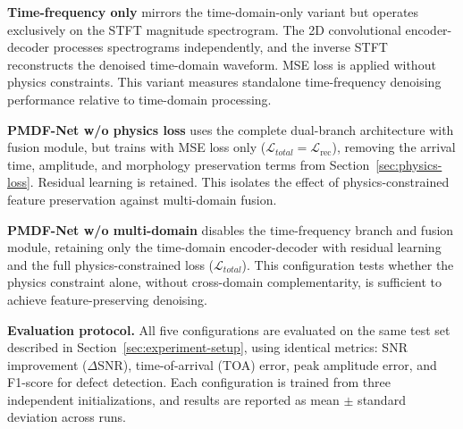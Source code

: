 \textbf{Time-frequency only} mirrors the time-domain-only variant but operates exclusively on the STFT magnitude spectrogram. The 2D convolutional encoder-decoder processes spectrograms independently, and the inverse STFT reconstructs the denoised time-domain waveform. MSE loss is applied without physics constraints. This variant measures standalone time-frequency denoising performance relative to time-domain processing.

\textbf{PMDF-Net w/o physics loss} uses the complete dual-branch architecture with fusion module, but trains with MSE loss only ($\mathcal{L}_{total} = \mathcal{L}_{\text{rec}}$), removing the arrival time, amplitude, and morphology preservation terms from Section~\ref{sec:physics-loss}. Residual learning is retained. This isolates the effect of physics-constrained feature preservation against multi-domain fusion.

\textbf{PMDF-Net w/o multi-domain} disables the time-frequency branch and fusion module, retaining only the time-domain encoder-decoder with residual learning and the full physics-constrained loss ($\mathcal{L}_{total}$). This configuration tests whether the physics constraint alone, without cross-domain complementarity, is sufficient to achieve feature-preserving denoising.

\textbf{Evaluation protocol.} All five configurations are evaluated on the same test set described in Section~\ref{sec:experiment-setup}, using identical metrics: SNR improvement ($\Delta$SNR), time-of-arrival (TOA) error, peak amplitude error, and F1-score for defect detection. Each configuration is trained from three independent initializations, and results are reported as mean $\pm$ standard deviation across runs.